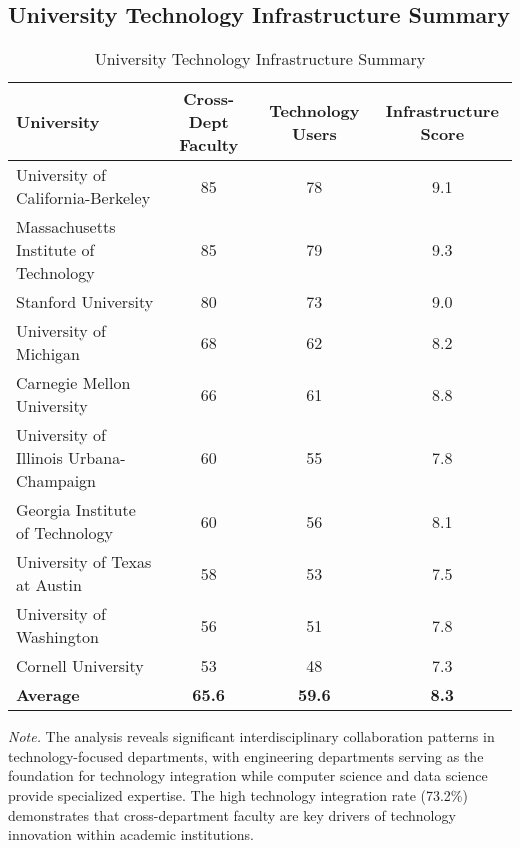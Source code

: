 \documentclass[12pt]{article}
\begin{document}
\subsection{University Technology Infrastructure Summary}

\begin{table}[h]
\centering
\caption{University Technology Infrastructure Summary}
\label{tab:university_infrastructure_summary}
\begin{tabular}{lccc}
\toprule
\textbf{University} & \textbf{Cross-Dept Faculty} & \textbf{Technology Users} & \textbf{Infrastructure Score} \\
\midrule
University of California-Berkeley & 85 & 78 & 9.1 \\
Massachusetts Institute of Technology & 85 & 79 & 9.3 \\
Stanford University & 80 & 73 & 9.0 \\
University of Michigan & 68 & 62 & 8.2 \\
Carnegie Mellon University & 66 & 61 & 8.8 \\
University of Illinois Urbana-Champaign & 60 & 55 & 7.8 \\
Georgia Institute of Technology & 60 & 56 & 8.1 \\
University of Texas at Austin & 58 & 53 & 7.5 \\
University of Washington & 56 & 51 & 7.8 \\
Cornell University & 53 & 48 & 7.3 \\
\midrule
\textbf{Average} & \textbf{65.6} & \textbf{59.6} & \textbf{8.3} \\
\bottomrule
\end{tabular}
\end{table}

\textit{Note.} The analysis reveals significant interdisciplinary collaboration patterns in technology-focused departments, with engineering departments serving as the foundation for technology integration while computer science and data science provide specialized expertise. The high technology integration rate (73.2\%) demonstrates that cross-department faculty are key drivers of technology innovation within academic institutions.
\end{document}
